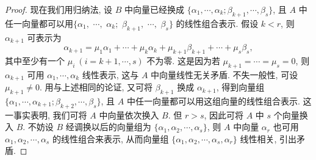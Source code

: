\documentclass[../../main.tex]{subfiles}%
\begin{document}
\begin{proof}
现在我们用归纳法, 设 \( B \) 中向量已经换成 \( \{\alpha_1, \cdots, \alpha_k; \beta_{k+1}, \cdots, \beta_s\} \), 且 \( A \) 中任一向量都可以用$\{\alpha_1,$ $ \cdots,$ $ \alpha_k;$ $ \beta_{k+1},$ $\cdots,$ $\beta_s\}$ 的线性组合表示. 假设 \( k < r \), 则 \( \alpha_{k+1} \) 可表示为
\[
\alpha_{k+1} = \mu_1\alpha_1 + \cdots + \mu_k\alpha_k + \mu_{k+1}\beta_{k+1} + \cdots + \mu_s\beta_s,
\]
其中至少有一个 \( \mu_i \ (i = k+1, \cdots, s) \) 不为零. 这是因为若 \( \mu_{k+1} = \cdots = \mu_s = 0 \), 则 \( \alpha_{k+1} \) 可用 \( \alpha_1, \cdots, \alpha_k \) 线性表示, 这与 \( A \) 中向量线性无关矛盾. 不失一般性, 可设 \( \mu_{k+1} \neq 0 \). 用与上述相同的论证, 又可将 \( \beta_{k+1} \) 换成 \( \alpha_{k+1} \), 得到向量组 \( \{\alpha_1, \cdots, \alpha_{k+1}; \beta_{k+2}, \cdots, \beta_s\} \), 且 \( A \) 中任一向量都可以用这组向量的线性组合表示. 这一事实表明, 我们可将 \( A \) 中向量依次换入 \( B \). 但 \( r > s \), 因此可将 \( A \) 中 \( s \) 个向量换入 \( B \). 不妨设 \( B \) 经调换以后的向量组为 \( \{\alpha_1, \alpha_2, \cdots, \alpha_s\} \), 则 \( A \) 中向量 \( \alpha_r \) 也可用 \( \alpha_1, \alpha_2, \cdots, \alpha_s \) 的线性组合来表示, 从而向量组 \( \{\alpha_1, \alpha_2, \cdots, \alpha_s, \alpha_r\} \) 线性相关, 引出矛盾.

\end{proof}
\end{document}
